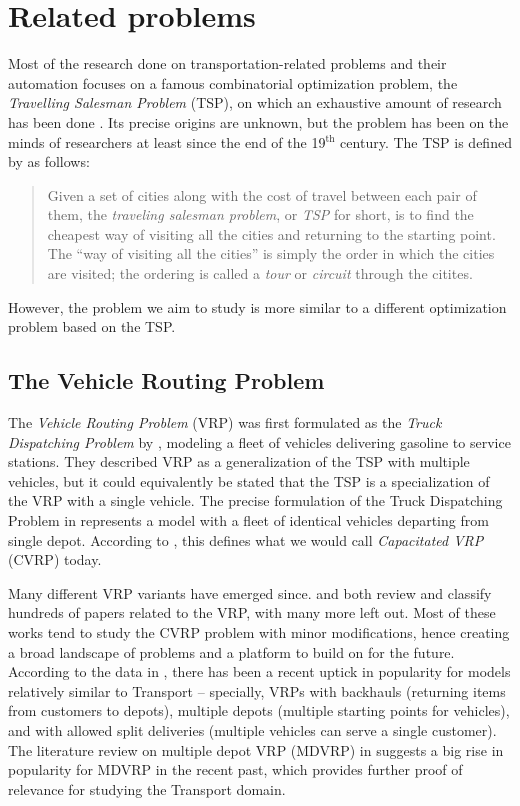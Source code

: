 \section{Related problems}

Most of the research done on transportation-related problems and their automation focuses
on a famous combinatorial optimization problem, the \textit{Travelling Salesman Problem} (TSP), on which an
exhaustive amount of research has been done \citep{Applegate1998, Applegate2011}.
Its precise origins are unknown, but the problem has been on the minds of researchers at least since the end of the 19$^\textrm{th}$ century. The TSP is defined by \citet{Applegate2011} as follows:

\begin{quote}
Given a set of cities along with the cost of travel between each pair of them, the \textit{traveling salesman problem}, or \textit{TSP} for short, is to find the cheapest way of visiting all the cities and returning to the starting point. The ``way of visiting all the cities'' is simply the order in which the cities are visited; the ordering is called a \textit{tour} or \textit{circuit} through the citites.
\end{quote}

However, the problem we aim to study is more similar to a different optimization problem based on the TSP.

\subsection{The Vehicle Routing Problem}

The \textit{Vehicle Routing Problem} (VRP) was first formulated as the \textit{Truck Dispatching Problem} by \citet{Dantzig1959}, modeling a fleet of vehicles delivering gasoline to service stations. They described VRP as a generalization of the TSP with multiple vehicles, but it could equivalently be stated that the TSP is a specialization of the VRP
with a single vehicle. The precise formulation of the Truck Dispatching Problem in \citep[Section~2]{Dantzig1959} represents a model with a fleet of identical vehicles departing from single depot. According to \citet[Section~3]{Braekers2016}, this defines what we would call \textit{Capacitated VRP} (CVRP) today.

Many different VRP variants have emerged since. \citet{Eksioglu2009} and \citet{Braekers2016} both
review and classify hundreds of papers related to the VRP, with many more left out.
Most of these works tend to study the CVRP problem with minor modifications, hence creating
a broad landscape of problems and a platform to build on for the future.
According to the data in \citet[Table~4]{Braekers2016}, there has been a recent uptick
in popularity for models relatively similar to Transport -- specially, VRPs with
backhauls (returning items from customers to depots),
multiple depots (multiple starting points for vehicles), and with allowed split deliveries (multiple
vehicles can serve a single customer).
The literature review on multiple depot VRP (MDVRP) in \citet{Montoya-Torres2015}
suggests a big rise in popularity for MDVRP in the recent past,
which provides further proof of relevance for studying the Transport domain.


